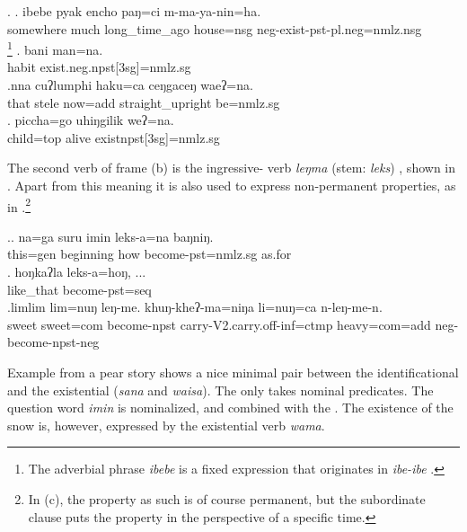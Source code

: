	\ex. \ag. ibebe    pyak encho         paŋ=ci    m-ma-ya-nin=ha.\\
somewhere much long\_time\_ago house{\sc =nsg} {\sc neg-}exist{\sc -pst-pl.neg=nmlz.nsg}\\
  \footnote{The adverbial phrase \emph{ibebe} is a fixed expression that originates in  \emph{ibe-ibe} .} 
  \bg. bani man=na.\\
  habit exist{\sc .neg.npst[3sg]=nmlz.sg}\\
	\bg.nna  cuʔlumphi haku=ca   ceŋgaceŋ       waeʔ=na.\\
	that stele now{\sc =add} straight\_upright be{\sc [3sg;npst]=nmlz.sg}\\
 
\bg. piccha=go  uhiŋgilik weʔ=na.\\ 
child{\sc=top} alive exist{\sc npst[3sg]=nmlz.sg}	\\ 
 	


The second verb of frame (b) is the ingressive- verb \emph{leŋma} (stem: \emph{leks}) , shown in \Next. Apart from this meaning it is also used to express non-permanent properties, as in \Next[c].\footnote{In (c), the property as such is of course permanent, but the subordinate clause puts the property in the perspective of a specific time.}

\ex.\ag. na=ga  suru   imin leks-a=na    baŋniŋ.\\
		this{\sc =gen} beginning how become{\sc [3sg]-pst=nmlz.sg} as.for\\
	 
	\bg.  hoŋkaʔla  leks-a=hoŋ, ...\\
	like\_that become{\sc [3sg]-pst=seq}\\
 
\bg.limlim lim=nuŋ leŋ-me.     khuŋ-kheʔ-ma=niŋa          li=nuŋ=ca    n-leŋ-me-n.\\
sweet sweet{\sc =com} become{\sc [3sg]-npst} carry{\sc -V2.carry.off-inf=ctmp} heavy{\sc =com=add} {\sc neg-}become{\sc [3sg]-npst-neg}\\


Example \Next from a pear story shows a nice minimal pair between the identificational and the existential  (\emph{sana} and \emph{waisa}). The  only takes nominal predicates. The question word \emph{imin}  is nominalized, and combined with the . The existence of the snow is, however, expressed by the existential  verb \emph{wama}.

